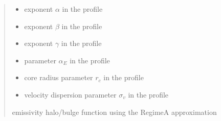 \documentclass[letterpaper,10pt,english]{sphinxmanual}
\begin{document}
\begin{fulllineitems}
\begin{quote}
\begin{description}
\begin{itemize}
\item {} 
\sphinxAtStartPar
{} \textendash{} exponent \(\alpha\) in the {\hyperref[\detokenize{diffsph.profiles:diffsph.profiles.templates.hdz}]{}} profile

\item {} 
\sphinxAtStartPar
{} \textendash{} exponent \(\beta\) in the {\hyperref[\detokenize{diffsph.profiles:diffsph.profiles.templates.hdz}]{}} profile

\item {} 
\sphinxAtStartPar
{} \textendash{} exponent \(\gamma\) in the {\hyperref[\detokenize{diffsph.profiles:diffsph.profiles.templates.hdz}]{}} profile

\item {} 
\sphinxAtStartPar
{} \textendash{} parameter \(\alpha_E\) in the {\hyperref[\detokenize{diffsph.profiles:diffsph.profiles.templates.enst}]{}} profile

\item {} 
\sphinxAtStartPar
{} \textendash{} core radius parameter \(r_c\) in the {\hyperref[\detokenize{diffsph.profiles:diffsph.profiles.templates.cnfw}]{}} profile

\item {} 
\sphinxAtStartPar
{} \textendash{} velocity dispersion parameter \(\sigma_v\) in the {\hyperref[\detokenize{diffsph.profiles:diffsph.profiles.templates.sis}]{}} profile

\end{itemize}

\sphinxAtStartPar
emissivity halo/bulge function using the Regime\sphinxhyphen{}A approximation

\end{description}\end{quote}

\end{fulllineitems}
\end{document}
